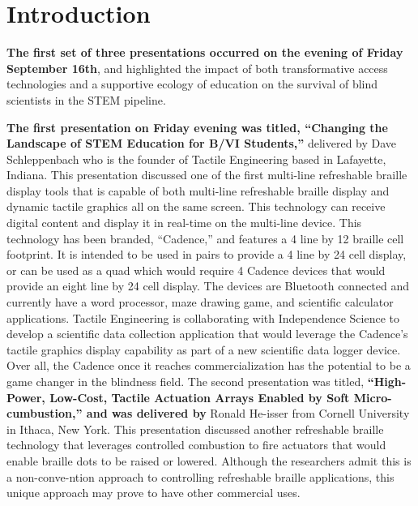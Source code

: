 \documentclass[11.5pt]{sig-alternate}
\begin{document}
\vspace{5mm}
\section*{\vspace{140mm}}
\section*{Introduction}
\begin{large}

\textbf{The first set of three presentations occurred on the evening of Friday September 16th}, and highlighted the impact of both transformative access technologies and a supportive ecology of education on the survival of blind scientists in the STEM pipeline. 

\textbf{The first presentation on Friday evening was titled, “Changing the Landscape of STEM Education for B/VI Students,”} delivered by Dave Schleppenbach who is the founder of Tactile Engineering based in Lafayette, Indiana. This presentation discussed one of the first multi-line refreshable braille display tools that is capable of both multi-line refreshable braille display and dynamic tactile graphics all on the same screen. This technology can receive digital content and display it in real-time on the multi-line device. This technology has been branded, “Cadence,” and features a 4 line by 12 braille cell footprint. It is intended to be used in pairs to provide a 4 line by 24 cell display, or can be used as a quad which would require 4 Cadence devices that would provide an eight line by 24 cell display. The devices are Bluetooth connected and currently have a word processor, maze drawing game, and scientific calculator applications. Tactile Engineering is collaborating with Independence Science to develop a scientific data collection application that would leverage the Cadence’s tactile graphics display capability as part of a new scientific data logger device. Over all, the Cadence once it reaches commercialization has the potential to be a game changer in the blindness field. The second presentation was titled, \textbf{“High-Power, Low-Cost, Tactile Actuation Arrays Enabled by Soft Micro-cumbustion,” and was delivered by} Ronald He-isser from Cornell University in Ithaca, New York. This presentation discussed another refreshable braille technology that leverages controlled combustion to fire actuators that would enable braille dots to be raised or lowered. Although the researchers admit this is a non-conve-ntion approach to controlling refreshable braille applications, this unique approach may prove to have other commercial uses.


\end{large}
\end{document}
